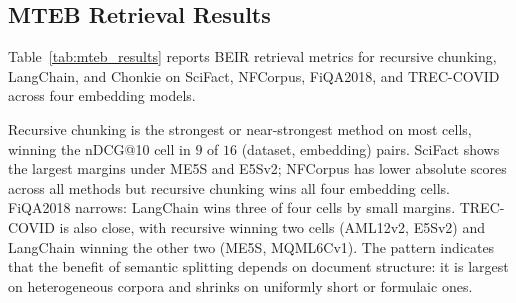 \subsection{MTEB Retrieval Results}
\label{sec:mteb_results}
Table~\ref{tab:mteb_results} reports BEIR retrieval metrics for recursive chunking, LangChain, and Chonkie on SciFact, NFCorpus, FiQA2018, and TREC-COVID across four embedding models.

Recursive chunking is the strongest or near-strongest method on most cells, winning the nDCG@10 cell in $9$ of $16$ (dataset, embedding) pairs. SciFact shows the largest margins under ME5S and E5Sv2; NFCorpus has lower absolute scores across all methods but recursive chunking wins all four embedding cells. FiQA2018 narrows: LangChain wins three of four cells by small margins. TREC-COVID is also close, with recursive winning two cells (AML12v2, E5Sv2) and LangChain winning the other two (ME5S, MQML6Cv1). The pattern indicates that the benefit of semantic splitting depends on document structure: it is largest on heterogeneous corpora and shrinks on uniformly short or formulaic ones.

